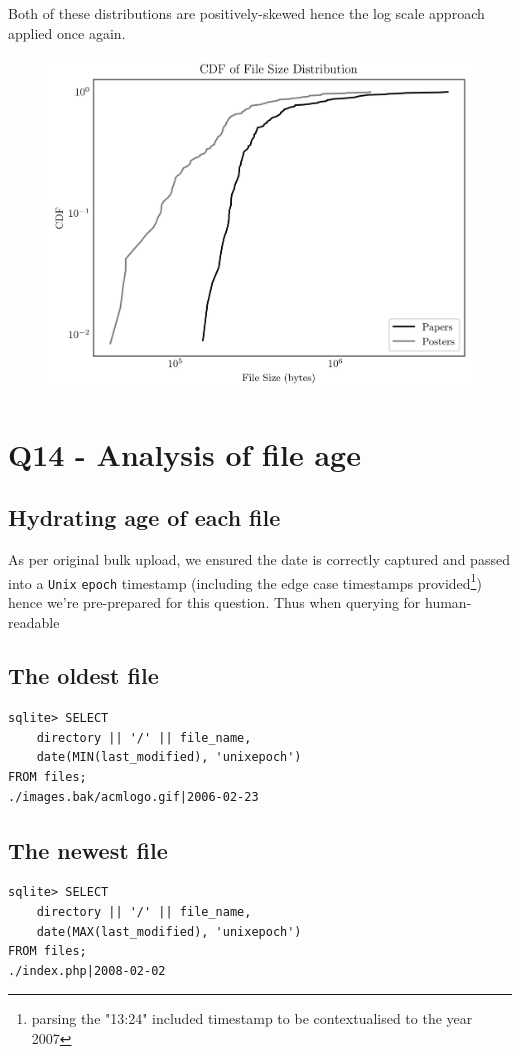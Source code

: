 \documentclass{article}
\begin{document}
Both of these distributions are positively-skewed hence the log scale approach applied once again.

\begin{figure}[htbp]
\centering
\includegraphics[width=\linewidth]{./images/papers_posters_size_cdf.png}
\end{figure}

\newpage
\section*{Q14 - Analysis of file age}
\subsection*{Hydrating age of each file}
As per original bulk upload, we ensured the date is correctly captured and passed into a \texttt{Unix} \texttt{epoch} timestamp (including the edge case timestamps provided\footnote{parsing the "13:24" included timestamp to be contextualised to the year 2007}) hence we're pre-prepared for this question. Thus when querying for human-readable

\subsection*{The oldest file}
\begin{verbatim}
sqlite> SELECT 
    directory || '/' || file_name,
    date(MIN(last_modified), 'unixepoch')
FROM files;
./images.bak/acmlogo.gif|2006-02-23
\end{verbatim}
\subsection*{The newest file}
\begin{verbatim}
sqlite> SELECT 
    directory || '/' || file_name,
    date(MAX(last_modified), 'unixepoch')                   
FROM files;
./index.php|2008-02-02
\end{verbatim}
\end{document}
